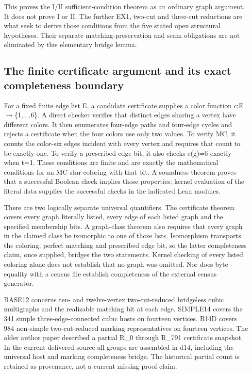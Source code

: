 \documentclass[11pt,a4paper]{article}
\begin{document}
This proves the I/II sufficient-condition theorem as an ordinary graph argument. It does not prove I or II. The further EX1, two-cut and three-cut reductions are what seek to derive those conditions from the five stated open structural hypotheses. Their separate matching-preservation and seam obligations are not eliminated by this elementary bridge lemma.

\subsection{The finite certificate argument and its exact completeness boundary}
For a fixed finite edge list E, a candidate certificate supplies a color function c:E\ensuremath{\to}\{1,...,6\}. A direct checker verifies that distinct edges sharing a vertex have different colors. It then enumerates four-edge paths and four-edge cycles and rejects a certificate when the four colors use only two values. To verify MC, it counts the color-six edges incident with every vertex and requires that count to be exactly one. To verify a prescribed edge bit, it also checks c(g)=6 exactly when t=1. These conditions are finite and are exactly the mathematical conditions for an MC star coloring with that bit. A soundness theorem proves that a successful Boolean check implies those properties; kernel evaluation of the literal data supplies the successful checks in the indicated Lean modules.

There are two logically separate universal quantifiers. The certificate theorem covers every graph literally listed, every edge of each listed graph and the specified membership bits. A graph-class theorem also requires that every graph in the claimed class be isomorphic to one of those lists. Isomorphism transports the coloring, perfect matching and prescribed edge bit, so the latter completeness claim, once supplied, bridges the two statements. Kernel checking of every listed coloring alone does not establish that no graph was omitted. Nor does byte equality with a census file establish completeness of the external census generator.

BASE12 concerns ten- and twelve-vertex two-cut-reduced bridgeless cubic multigraphs and the realizable matching bit at each edge. SIMPLE14 covers the 341 simple three-edge-connected cubic hosts on fourteen vertices. B14D covers 984 non-simple two-cut-reduced marking representatives on fourteen vertices. The older author paper described a partial R\_0 through R\_791 certificate snapshot. In the current delivered source all groups are assembled in d14, including the universal host and marking completeness bridge. The historical partial count is retained as provenance, not a current missing-proof claim.
\end{document}
